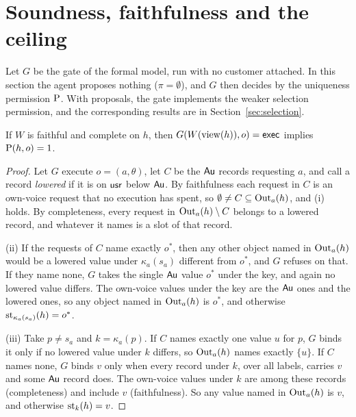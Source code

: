 \section{Soundness, faithfulness and the ceiling}\label{sec:ceiling}

Let $G$ be the gate of the formal model, run with no customer attached. In this section the
agent proposes nothing ($\pi = \emptyset$), and $G$ then decides by the uniqueness permission
$\mathrm{P}$. With proposals, the gate implements the weaker selection permission, and the
corresponding results are in Section~\ref{sec:selection}.

\begin{theorem}\label{thm:sound}
If $W$ is faithful and complete on $h$, then $G(W(\mathrm{view}(h)), o) = \mathsf{exec}$ implies
$\mathrm{P}(h, o) = 1$.
\end{theorem}
\begin{proof}
Let $G$ execute $o = (a, \theta)$, let $C$ be the $\mathsf{Au}$ records requesting $a$, and call a record
\emph{lowered} if it is on $\mathsf{usr}$ below $\mathsf{Au}$. By faithfulness each request in $C$ is an own-voice
request that no execution has spent, so $\emptyset \neq C \subseteq \mathrm{Out}_a(h)$, and (i) holds. By
completeness, every request in $\mathrm{Out}_a(h) \setminus C$ belongs to a lowered record, and whatever it
names is a slot of that record.

(ii) If the requests of $C$ name exactly $o^*$, then any other object named in $\mathrm{Out}_a(h)$ would be a
lowered value under $\kappa_a(s_a)$ different from $o^*$, and $G$ refuses on that. If they name
none, $G$ takes the single $\mathsf{Au}$ value $o^*$ under the key, and again no lowered value differs. The
own-voice values under the key are the $\mathsf{Au}$ ones and the lowered ones, so any object named in
$\mathrm{Out}_a(h)$ is $o^*$, and otherwise $\mathrm{st}_{\kappa_a(s_a)}(h) = o^*$.

(iii) Take $p \neq s_a$ and $k = \kappa_a(p)$. If $C$ names exactly one value $u$ for $p$, $G$ binds it
only if no lowered value under $k$ differs, so $\mathrm{Out}_a(h)$ names exactly $\{u\}$. If $C$ names none,
$G$ binds $v$ only when every record under $k$, over all labels, carries $v$ and some $\mathsf{Au}$ record
does. The own-voice values under $k$ are among these records (completeness) and include $v$
(faithfulness). So any value named in $\mathrm{Out}_a(h)$ is $v$, and otherwise $\mathrm{st}_k(h) = v$.
\end{proof}

